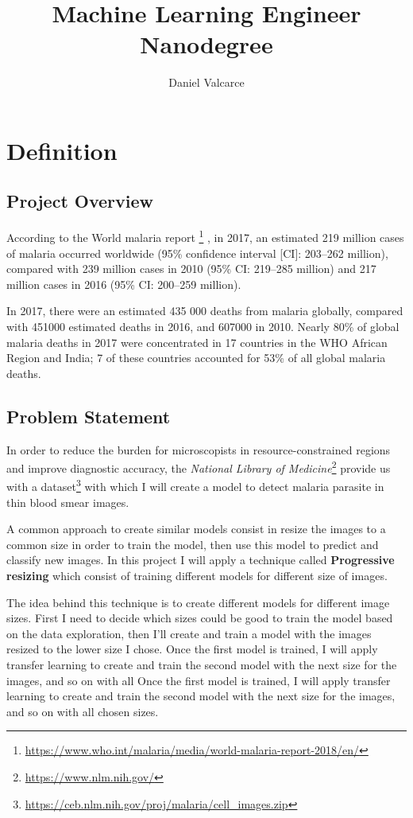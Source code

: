 \documentclass[a4paper]{article}
\title{Machine Learning Engineer Nanodegree}
\author{Daniel Valcarce}
\begin{document}
	\maketitle
	\newpage
	
	\section{Definition}
	\subsection{Project Overview}
	According to the World malaria report \footnote{\label{malaria_report}\url{https://www.who.int/malaria/media/world-malaria-report-2018/en/}} , in 2017, an estimated 219 million cases of malaria
	occurred worldwide (95\% confidence interval [CI]: 203–262 million), compared with 239
	million cases in 2010 (95\% CI: 219–285 million) and 217 million cases in 2016 (95\% CI: 200–259
	million).
	
	\medskip
	In 2017, there were an estimated 435 000 deaths from malaria globally, compared with
	451000 estimated deaths in 2016, and 607000 in 2010. Nearly 80\% of global malaria deaths in
	2017 were concentrated in 17 countries in the WHO African Region and India; 7 of these
	countries accounted for 53\% of all global malaria deaths.

	\subsection{Problem Statement}
	In order to reduce the burden for microscopists in resource-constrained regions and improve
	diagnostic accuracy, the \textit{National Library of Medicine}\footnote{\label{nlm_web}\url{https://www.nlm.nih.gov/}} provide us with a dataset\footnote{\label{dataset}\url{https://ceb.nlm.nih.gov/proj/malaria/cell_images.zip}} with which I
	will create a model to detect malaria parasite in thin blood smear images.
	
	\medskip
	A common approach to create similar models consist in resize the images to a common size in order to train the model, then use this model to predict and classify new images. In this project I will apply a technique called \textbf{Progressive resizing} which consist of training different models for different size of images.
	
	\medskip
	The idea behind this technique is to create different models for different image sizes. First I need to decide which sizes could be good to train the model based on the data exploration, then I'll create and train a model with the images resized to the lower size I chose. Once the first model is trained, I will apply transfer learning to create and train the second model with the next size for the images, and so on with all Once the first model is trained, I will apply transfer learning to create and train the second model with the next size for the images, and so on with all chosen sizes.
	
\end{document}
